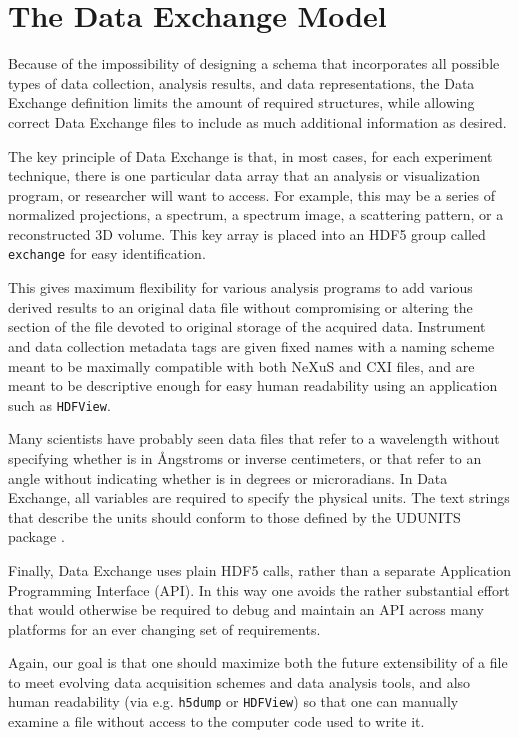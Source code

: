 \documentclass[pdf]{iucr}              %
\begin{document}
\section{The Data Exchange Model}

Because of the impossibility of designing a schema that incorporates all possible types of data collection, analysis results, and data representations, the Data Exchange definition limits the amount of required structures, while allowing correct Data Exchange files to include as much additional information as desired.  

The key principle of Data Exchange is that, in most cases, for each experiment technique, there is one particular data array that an analysis or visualization program, or researcher will want to access. For example, this may be a series of normalized projections, a spectrum, a spectrum image, a scattering pattern, or a reconstructed 3D volume. This key array is placed into an HDF5 group called \texttt{exchange} for easy identification.

This gives maximum flexibility for various analysis programs to add various derived results to an original data file without compromising or altering the section of the file devoted to original storage of the acquired data. Instrument and data collection metadata tags are given fixed names with a naming scheme meant to be maximally compatible with both NeXuS \cite{NeXuS} and CXI \cite{maia_nm_2012} files, and are meant to be descriptive enough for easy human readability using an application such as \texttt{HDFView}. 

Many scientists have probably seen data files that refer to a wavelength without specifying whether is in \AA{}ngstroms or inverse centimeters, or that refer to an angle without indicating whether is in degrees or microradians. In Data Exchange, all variables are required to specify the physical units. The text strings that describe the units should conform to those defined by the UDUNITS package \cite{ucar_2013}.

Finally, Data Exchange uses plain HDF5 calls, rather than a separate Application Programming Interface (API). In this way one avoids the rather substantial effort that would otherwise be required to debug and maintain an API across many platforms for an ever changing set of requirements.

Again, our goal is that one should maximize both the future extensibility of a file to meet evolving data acquisition schemes and data analysis tools, and also human readability (via e.g. \texttt{h5dump} or \texttt{HDFView}) so that one can manually examine a file without access to the computer code used to write it.
\end{document}
